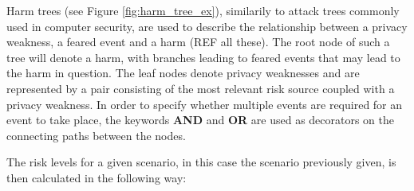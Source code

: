 Harm trees (see Figure \ref{fig:harm_tree_ex}), similarily to attack trees
commonly used in computer security\cite{de2016priam}, are used to describe the
relationship between a privacy weakness, a feared event and a harm (REF all
these). The root node of such a tree will denote a harm, with branches leading
to feared events that may lead to the harm in question. The leaf nodes denote
privacy weaknesses and are represented by a pair consisting of the most relevant
risk source coupled with a privacy weakness. In order to specify whether
multiple events are required for an event to take place, the keywords
\textbf{AND} and \textbf{OR} are used as decorators on the connecting paths
between the nodes.


The risk levels for a given scenario, in this case the scenario previously
given, is then calculated in the following way\cite{de2016priam}:


